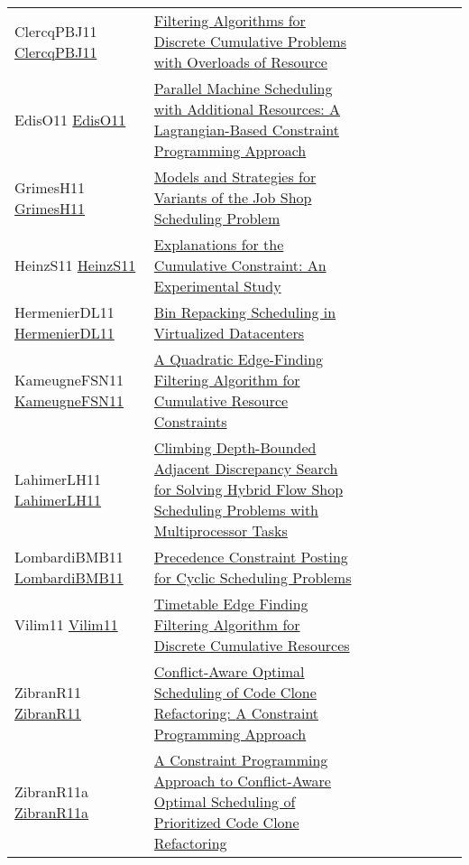 {\begin{longtable}{p{3cm}p{7cm}lllllll}
ClercqPBJ11 \href{https://doi.org/10.1007/978-3-642-23786-7\_20}{ClercqPBJ11} &  \href{papers/ClercqPBJ11.pdf}{Filtering Algorithms for Discrete Cumulative Problems with Overloads of Resource} &  &  &  &  &  &  & \\
EdisO11 \href{https://doi.org/10.1007/978-3-642-21311-3\_10}{EdisO11} &  \href{papers/EdisO11.pdf}{Parallel Machine Scheduling with Additional Resources: {A} Lagrangian-Based Constraint Programming Approach} &  &  &  &  &  &  & \\
GrimesH11 \href{https://doi.org/10.1007/978-3-642-23786-7\_28}{GrimesH11} &  \href{papers/GrimesH11.pdf}{Models and Strategies for Variants of the Job Shop Scheduling Problem} &  &  &  &  &  &  & \\
HeinzS11 \href{https://doi.org/10.1007/978-3-642-20662-7\_34}{HeinzS11} &  \href{papers/HeinzS11.pdf}{Explanations for the Cumulative Constraint: An Experimental Study} &  &  &  &  &  &  & \\
HermenierDL11 \href{https://doi.org/10.1007/978-3-642-23786-7\_5}{HermenierDL11} &  \href{papers/HermenierDL11.pdf}{Bin Repacking Scheduling in Virtualized Datacenters} &  &  &  &  &  &  & \\
KameugneFSN11 \href{https://doi.org/10.1007/978-3-642-23786-7\_37}{KameugneFSN11} &  \href{papers/KameugneFSN11.pdf}{A Quadratic Edge-Finding Filtering Algorithm for Cumulative Resource Constraints} &  &  &  &  &  &  & \\
LahimerLH11 \href{https://doi.org/10.1007/978-3-642-21311-3\_12}{LahimerLH11} &  \href{papers/LahimerLH11.pdf}{Climbing Depth-Bounded Adjacent Discrepancy Search for Solving Hybrid Flow Shop Scheduling Problems with Multiprocessor Tasks} &  &  &  &  &  &  & \\
LombardiBMB11 \href{https://doi.org/10.1007/978-3-642-21311-3\_14}{LombardiBMB11} &  \href{papers/LombardiBMB11.pdf}{Precedence Constraint Posting for Cyclic Scheduling Problems} &  &  &  &  &  &  & \\
Vilim11 \href{https://doi.org/10.1007/978-3-642-21311-3\_22}{Vilim11} &  \href{papers/Vilim11.pdf}{Timetable Edge Finding Filtering Algorithm for Discrete Cumulative Resources} &  &  &  &  &  &  & \\
ZibranR11 \href{https://doi.org/10.1109/ICPC.2011.45}{ZibranR11} &  \href{papers/ZibranR11.pdf}{Conflict-Aware Optimal Scheduling of Code Clone Refactoring: {A} Constraint Programming Approach} &  &  &  &  &  &  & \\
ZibranR11a \href{https://doi.org/10.1109/SCAM.2011.21}{ZibranR11a} &  \href{papers/ZibranR11a.pdf}{A Constraint Programming Approach to Conflict-Aware Optimal Scheduling of Prioritized Code Clone Refactoring} &  &  &  &  &  &  & \\

\end{longtable}}
